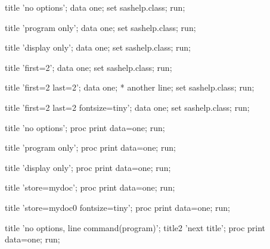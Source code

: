 \documentclass{article}
\begin{document}
\begin{Datastep}
title 'no options';
data one;
  set sashelp.class;
run;
\end{Datastep}

\begin{Datastep}[program]
title 'program only';
data one;
  set sashelp.class;
run;
\end{Datastep}

\begin{Datastep}[display]
title 'display only';
data one;
  set sashelp.class;
run;
\end{Datastep}

\begin{Datastep}[first=2]
title 'first=2';
data one;
  set sashelp.class;
run;
\end{Datastep}

\begin{Datastep}[first=2, last=2]
title 'first=2 last=2';
data one;
  * another line;
  set sashelp.class;
run;
\end{Datastep}

\begin{Datastep}[first=2, last=2, fontsize=tiny]
title 'first=2 last=2 fontsize=tiny';
data one;
  set sashelp.class;
run;
\end{Datastep}

\begin{Sascode}
title 'no options';
proc print data=one;
run;
\end{Sascode}

\begin{Sascode}[program]
title 'program only';
proc print data=one;
run;
\end{Sascode}

\begin{Sascode}[display]
title 'display only';
proc print data=one;
run;
\end{Sascode}


\begin{Sascode}[store=mydoc]
title 'store=mydoc';
proc print data=one;
run;
\end{Sascode}

\begin{Sascode}[store=mydoc0, fontsize=tiny]
title 'store=mydoc0 fontsize=tiny';
proc print data=one;
run;
\end{Sascode}

\begin{Sascode}
title 'no options, line command(program)';
title2 'next title';
proc print data=one;
run;
\end{Sascode}
\end{document}
